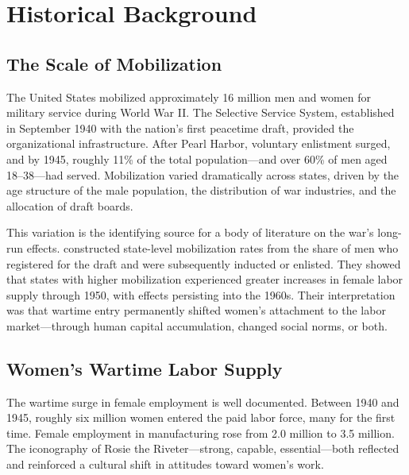 \documentclass[12pt]{article}
\begin{document}

\section{Historical Background}
\label{sec:background}

\subsection{The Scale of Mobilization}

The United States mobilized approximately 16 million men and women for military service during World War II. The Selective Service System, established in September 1940 with the nation's first peacetime draft, provided the organizational infrastructure. After Pearl Harbor, voluntary enlistment surged, and by 1945, roughly 11\% of the total population---and over 60\% of men aged 18--38---had served. Mobilization varied dramatically across states, driven by the age structure of the male population, the distribution of war industries, and the allocation of draft boards.

This variation is the identifying source for a body of literature on the war's long-run effects. \citet{acemoglu2004women} constructed state-level mobilization rates from the share of men who registered for the draft and were subsequently inducted or enlisted. They showed that states with higher mobilization experienced greater increases in female labor supply through 1950, with effects persisting into the 1960s. Their interpretation was that wartime entry permanently shifted women's attachment to the labor market---through human capital accumulation, changed social norms, or both.

\subsection{Women's Wartime Labor Supply}

The wartime surge in female employment is well documented. Between 1940 and 1945, roughly six million women entered the paid labor force, many for the first time. Female employment in manufacturing rose from 2.0 million to 3.5 million. The iconography of Rosie the Riveter---strong, capable, essential---both reflected and reinforced a cultural shift in attitudes toward women's work.
\end{document}

